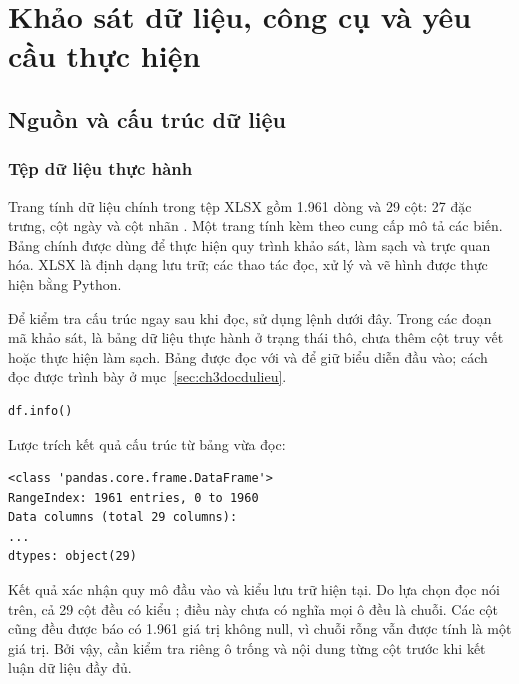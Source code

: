 \chapter{Khảo sát dữ liệu, công cụ và yêu cầu thực hiện}
\label{chap:khaosatdulieu}

\section{Nguồn và cấu trúc dữ liệu}
\label{sec:nguondulieu}

\subsection{Tệp dữ liệu thực hành}

Trang tính dữ liệu chính trong tệp XLSX gồm 1.961 dòng và 29 cột: 27 đặc trưng, cột ngày  và cột nhãn . Một trang tính kèm theo cung cấp mô tả các biến. Bảng chính được dùng để thực hiện quy trình khảo sát, làm sạch và trực quan hóa. XLSX là định dạng lưu trữ; các thao tác đọc, xử lý và vẽ hình được thực hiện bằng Python.

Để kiểm tra cấu trúc ngay sau khi đọc, sử dụng lệnh dưới đây. Trong các đoạn mã khảo sát,  là bảng dữ liệu thực hành ở trạng thái thô, chưa thêm cột truy vết hoặc thực hiện làm sạch. Bảng được đọc với  và  để giữ biểu diễn đầu vào; cách đọc được trình bày ở mục~\ref{sec:ch3docdulieu}.

\noindent\begin{minipage}{\linewidth}
\begin{lstlisting}[language=Python]
df.info()
\end{lstlisting}
\end{minipage}\par

Lược trích kết quả cấu trúc từ bảng vừa đọc:

\noindent\begin{minipage}{\linewidth}
\begin{lstlisting}[language={}]
<class 'pandas.core.frame.DataFrame'>
RangeIndex: 1961 entries, 0 to 1960
Data columns (total 29 columns):
...
dtypes: object(29)
\end{lstlisting}
\end{minipage}\par

Kết quả xác nhận quy mô đầu vào và kiểu lưu trữ hiện tại. Do lựa chọn đọc nói trên, cả 29 cột đều có kiểu ; điều này chưa có nghĩa mọi ô đều là chuỗi. Các cột cũng đều được báo có 1.961 giá trị không null, vì chuỗi rỗng vẫn được tính là một giá trị. Bởi vậy, cần kiểm tra riêng ô trống và nội dung từng cột trước khi kết luận dữ liệu đầy đủ.

